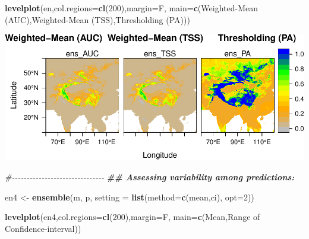 \documentclass[
]{article}
\newenvironment{Shaded}{\begin{snugshade}}{\end{snugshade}}
\newcommand{\AttributeTok}[1]{\textcolor[rgb]{0.13,0.29,0.53}{#1}}
\newcommand{\CommentTok}[1]{\textcolor[rgb]{0.56,0.35,0.01}{\textit{#1}}}
\newcommand{\DecValTok}[1]{\textcolor[rgb]{0.00,0.00,0.81}{#1}}
\newcommand{\DocumentationTok}[1]{\textcolor[rgb]{0.56,0.35,0.01}{\textbf{\textit{#1}}}}
\newcommand{\FunctionTok}[1]{\textcolor[rgb]{0.13,0.29,0.53}{\textbf{#1}}}
\newcommand{\NormalTok}[1]{#1}
\newcommand{\OtherTok}[1]{\textcolor[rgb]{0.56,0.35,0.01}{#1}}
\newcommand{\StringTok}[1]{\textcolor[rgb]{0.31,0.60,0.02}{#1}}
\begin{document}
\begin{Shaded}
\begin{Highlighting}[]
\FunctionTok{levelplot}\NormalTok{(en,}\AttributeTok{col.regions=}\FunctionTok{cl}\NormalTok{(}\DecValTok{200}\NormalTok{),}\AttributeTok{margin=}\NormalTok{F,}
          \AttributeTok{main=}\FunctionTok{c}\NormalTok{(}\StringTok{\textquotesingle{}Weighted{-}Mean (AUC)\textquotesingle{}}\NormalTok{,}\StringTok{\textquotesingle{}Weighted{-}Mean (TSS)\textquotesingle{}}\NormalTok{,}\StringTok{\textquotesingle{}Thresholding (PA)\textquotesingle{}}\NormalTok{))}
\end{Highlighting}
\end{Shaded}

\includegraphics{sdm_R_files/figure-latex/unnamed-chunk-10-1.pdf}

\begin{Shaded}
\begin{Highlighting}[]
\CommentTok{\#{-}{-}{-}{-}{-}{-}{-}{-}{-}{-}{-}{-}{-}{-}{-}{-}{-}{-}{-}{-}{-}{-}{-}{-}{-}{-}{-}{-}{-}{-}{-}}
\DocumentationTok{\#\# Assessing variability among predictions:}

\NormalTok{en4 }\OtherTok{\textless{}{-}} \FunctionTok{ensemble}\NormalTok{(m, p, }\AttributeTok{setting =} \FunctionTok{list}\NormalTok{(}\AttributeTok{method=}\FunctionTok{c}\NormalTok{(}\StringTok{\textquotesingle{}mean\textquotesingle{}}\NormalTok{,}\StringTok{\textquotesingle{}ci\textquotesingle{}}\NormalTok{), }\AttributeTok{opt=}\DecValTok{2}\NormalTok{))}

\FunctionTok{levelplot}\NormalTok{(en4,}\AttributeTok{col.regions=}\FunctionTok{cl}\NormalTok{(}\DecValTok{200}\NormalTok{),}\AttributeTok{margin=}\NormalTok{F,}
          \AttributeTok{main=}\FunctionTok{c}\NormalTok{(}\StringTok{\textquotesingle{}Mean\textquotesingle{}}\NormalTok{,}\StringTok{\textquotesingle{}Range of Confidence{-}interval\textquotesingle{}}\NormalTok{))}
\end{Highlighting}
\end{Shaded}
\end{document}
